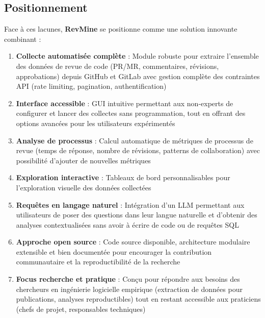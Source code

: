 \subsection{Positionnement}

Face à ces lacunes, \textbf{RevMine} se positionne comme une solution innovante combinant :

\begin{enumerate}
    \item \textbf{Collecte automatisée complète} : Module robuste pour extraire l'ensemble des données de revue de code (PR/MR, commentaires, révisions, approbations) depuis GitHub et GitLab avec gestion complète des contraintes API (rate limiting, pagination, authentification)
    
    \item \textbf{Interface accessible} : GUI intuitive permettant aux non-experts de configurer et lancer des collectes sans programmation, tout en offrant des options avancées pour les utilisateurs expérimentés
    
    \item \textbf{Analyse de processus} : Calcul automatique de métriques de processus de revue (temps de réponse, nombre de révisions, patterns de collaboration) avec possibilité d'ajouter de nouvelles métriques
    
    \item \textbf{Exploration interactive} : Tableaux de bord personnalisables pour l'exploration visuelle des données collectées
    
    \item \textbf{Requêtes en langage naturel} : Intégration d'un LLM permettant aux utilisateurs de poser des questions dans leur langue naturelle et d'obtenir des analyses contextualisées sans avoir à écrire de code ou de requêtes SQL
    
    \item \textbf{Approche open source} : Code source disponible, architecture modulaire extensible et bien documentée pour encourager la contribution communautaire et la reproductibilité de la recherche
    
    \item \textbf{Focus recherche et pratique} : Conçu pour répondre aux besoins des chercheurs en ingénierie logicielle empirique (extraction de données pour publications, analyses reproductibles) tout en restant accessible aux praticiens (chefs de projet, responsables techniques)
\end{enumerate}

